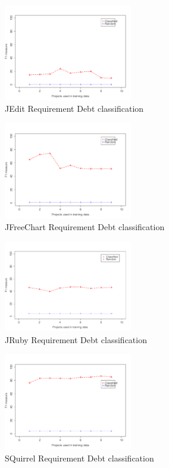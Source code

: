 \begin{figure}[thb!]
  \centering
  \includegraphics[width=0.50\textwidth]{figures/implementation_jedit.pdf}
  \vspace{-3mm}
  \caption{JEdit Requirement Debt classification}
  \label{fig:implementation_jedit}
\end{figure}

\begin{figure}[thb!]
  \centering
  \includegraphics[width=0.50\textwidth]{figures/implementation_jfreechart.pdf}
  \vspace{-3mm}
  \caption{JFreeChart Requirement Debt classification}
  \label{fig:implementation_jfreechart}
\end{figure}

\begin{figure}[thb!]
  \centering
  \includegraphics[width=0.50\textwidth]{figures/implementation_jruby.pdf}
  \vspace{-3mm}
  \caption{JRuby Requirement Debt classification}
  \label{fig:implementation_jruby}
\end{figure}

\begin{figure}[thb!]
  \centering
  \includegraphics[width=0.50\textwidth]{figures/implementation_sql.pdf}
  \vspace{-3mm}
  \caption{SQuirrel Requirement Debt classification}
  \label{fig:implementation_sql}
\end{figure}

\clearpage

 